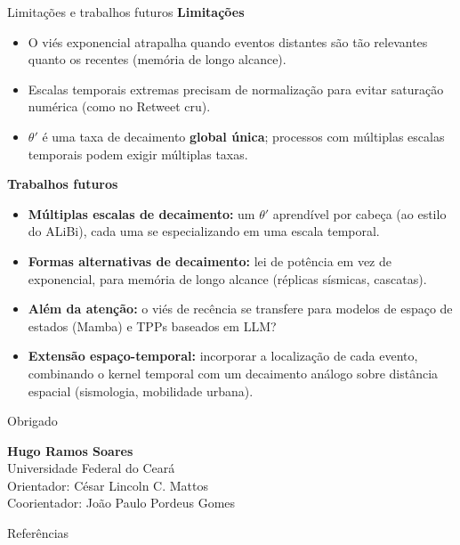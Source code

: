 \documentclass[aspectratio=169,9pt]{beamer}
\begin{document}
\begin{frame}[shrink]{Limitações e trabalhos futuros}
  \textbf{Limitações}
  \begin{itemize}
    \item O viés exponencial atrapalha quando eventos distantes são tão relevantes
          quanto os recentes (memória de longo alcance).
    \item Escalas temporais extremas precisam de normalização para evitar
          saturação numérica (como no Retweet cru).
    \item $\theta'$ é uma taxa de decaimento \textbf{global única}; processos com
          múltiplas escalas temporais podem exigir múltiplas taxas.
  \end{itemize}
  \vspace{-0.2em}
  \textbf{Trabalhos futuros}
  \begin{itemize}
    \item \textbf{Múltiplas escalas de decaimento:} um $\theta'$ aprendível por
          cabeça (ao estilo do ALiBi), cada uma se especializando em uma escala
          temporal.
    \item \textbf{Formas alternativas de decaimento:} lei de potência em vez de
          exponencial, para memória de longo alcance (réplicas sísmicas, cascatas).
    \item \textbf{Além da atenção:} o viés de recência se transfere para modelos
          de espaço de estados (Mamba) e TPPs baseados em LLM?
    \item \textbf{Extensão espaço-temporal:} incorporar a localização de cada
          evento, combinando o kernel temporal com um decaimento análogo sobre
          distância espacial (sismologia, mobilidade urbana).
  \end{itemize}
\end{frame}

\begin{frame}{Obrigado}
  \begin{center}
    \large \textbf{Hugo Ramos Soares} \\
    \normalsize
    Universidade Federal do Ceará \\
    Orientador: César Lincoln C. Mattos \\
    Coorientador: João Paulo Pordeus Gomes \\
  \end{center}
\end{frame}

\begin{frame}{Referências}
  \scriptsize
  
  
\end{frame}
\end{document}

